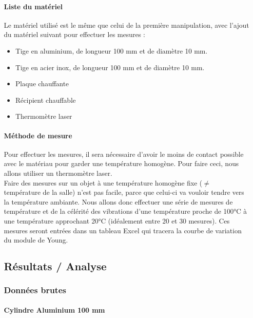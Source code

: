 \paragraph{Liste du matériel}
Le matériel utilisé est le même que 
celui de la première manipulation, 
avec l'ajout du matériel suivant pour 
effectuer les mesures :
\begin{itemize}
    \item Tige en aluminium, de longueur 100 mm et de diamètre 10 mm.\\
    \item Tige en acier inox, de longueur 100 mm et de diamètre 10 mm.\\
    \item Plaque chauffante\\
    \item Récipient chauffable\\
    \item Thermomètre laser\\
\end{itemize}

\paragraph{Méthode de mesure}
    Pour effectuer les mesures, il sera nécessaire d'avoir le moins
    de contact possible avec le matériau pour garder une température
    homogène. Pour faire ceci, nous allons utiliser un thermomètre laser.\\
    Faire des mesures sur un objet à une température homogène fixe
    ($\neq$ température de la salle) n'est pas facile, parce que celui-ci
    va vouloir tendre vers la température ambiante. Nous allons donc
    effectuer une série de mesures de température et de la célérité des
    vibrations d'une température proche de 100°C à une température
    approchant 20°C (idéalement entre 20 et 30 mesures). Ces mesures seront
    entrées dans un tableau Excel qui tracera la courbe de variation du
    module de Young.


\newpage

\subsection{\large Résultats / Analyse}
\subsubsection{\large Données brutes}
\paragraph{\large Cylindre Aluminium 100 mm}
